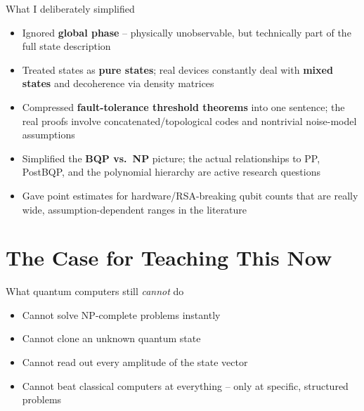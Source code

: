 \documentclass[aspectratio=169,11pt]{beamer}
\begin{document}
\begin{frame}{What I deliberately simplified}
  \small
  \begin{itemize}
    \item Ignored \textbf{global phase} -- physically unobservable, but
          technically part of the full state description
    \item Treated states as \textbf{pure states}; real devices constantly
          deal with \textbf{mixed states} and decoherence via density
          matrices
    \item Compressed \textbf{fault-tolerance threshold theorems} into one
          sentence; the real proofs involve concatenated/topological codes
          and nontrivial noise-model assumptions
    \item Simplified the \textbf{BQP vs.\ NP} picture; the actual
          relationships to PP, PostBQP, and the polynomial hierarchy are
          active research questions
    \item Gave point estimates for hardware/RSA-breaking qubit counts that
          are really wide, assumption-dependent ranges in the literature
  \end{itemize}
\end{frame}

\section{The Case for Teaching This Now}

\begin{frame}{What quantum computers still \emph{cannot} do}
  \begin{itemize}
    \item Cannot solve NP-complete problems instantly
    \item Cannot clone an unknown quantum state
    \item Cannot read out every amplitude of the state vector
    \item Cannot beat classical computers at everything -- only at
          specific, structured problems
  \end{itemize}
\end{frame}
\end{document}
